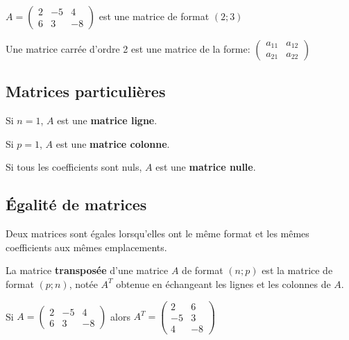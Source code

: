 \documentclass[french]{book}
\begin{document}
\begin{exemple}
   
    $A=\begin{pmatrix}
    2 & -5 & 4 \\ 
   6 & 3 & -8
   \end{pmatrix} $ est une matrice de format $(2;3)$
   
   Une matrice carrée d'ordre 2 est une matrice de la forme: $\begin{pmatrix}
    a_{11} & a_{12}  \\ 
   a_{21} & a_{22} 
   \end{pmatrix}$
   
\end{exemple}
   
\subsection{Matrices particulières}
   
    Si $n=1$, $A$ est une \textbf{matrice ligne}.
   
     Si $p=1$, $A$ est une \textbf{matrice colonne}.
   
    Si tous les coefficients sont nuls, $A$ est une \textbf{matrice nulle}.
   
\subsection{Égalité de matrices}
   \begin{defn}
   
    Deux matrices sont égales lorsqu'elles ont le même format et les mêmes coefficients aux mêmes emplacements.
   
   \end{defn}
   
\begin{defn}
   
   La matrice \textbf{transposée} d'une matrice $A$ de format $(n;p)$ est la matrice de format $(p;n)$, notée $A^{T}$ obtenue en échangeant les lignes et les colonnes de $A$.
   
\end{defn}   

\begin{exemple}

Si $A=\begin{pmatrix}
    2 & -5 & 4 \\ 
   6 & 3 & -8
   \end{pmatrix} $  alors $A^{T}=\begin{pmatrix}
    2 & 6 \\ 
   -5 & 3 \\
   4 &-8
   \end{pmatrix} $ 
   
\end{exemple}
   
\end{document}

